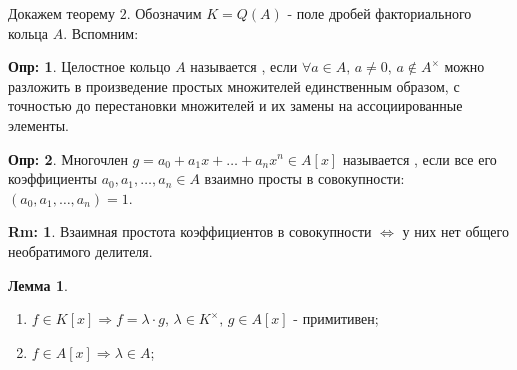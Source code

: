 \documentclass[12pt]{article}
\theoremstyle{definition}
\newtheorem{defn}{Опр:}
\newtheorem{rem}{Rm:}
\newtheorem{lemma}{Лемма}
\begin{document}
Докажем теорему $2$. Обозначим $K = Q(A)$ - поле дробей факториального кольца $A$. Вспомним:
\begin{defn}
	Целостное кольцо $A$ называется , если $\forall a \in A, \, a\neq 0, \, a\not\in A^{\times}$ можно разложить в произведение простых множителей единственным образом, с точностью до перестановки множителей и их замены на ассоциированные элементы.
\end{defn}
\begin{defn}
	Многочлен $g = a_0 + a_1 x + \dotsc + a_nx^n \in A[x]$ называется , если все его коэффициенты $a_0,a_1,\dotsc,a_n \in A$ взаимно просты в совокупности: $(a_0,a_1,\dotsc,a_n) = 1$.
\end{defn}
\begin{rem}
	Взаимная простота коэффициентов в совокупности $\Leftrightarrow$ у них нет общего необратимого делителя.
\end{rem}
\begin{lemma}\hfill
	\begin{enumerate}[label=\arabic*)]
		\item $f \in K[x] \Rightarrow f = \lambda{\cdot}g, \, \lambda \in K^{\times}, \, g\in A[x]$ - примитивен;
		\item $f \in A[x] \Rightarrow \lambda \in A$;
	\end{enumerate}
\end{lemma}
\end{document}
